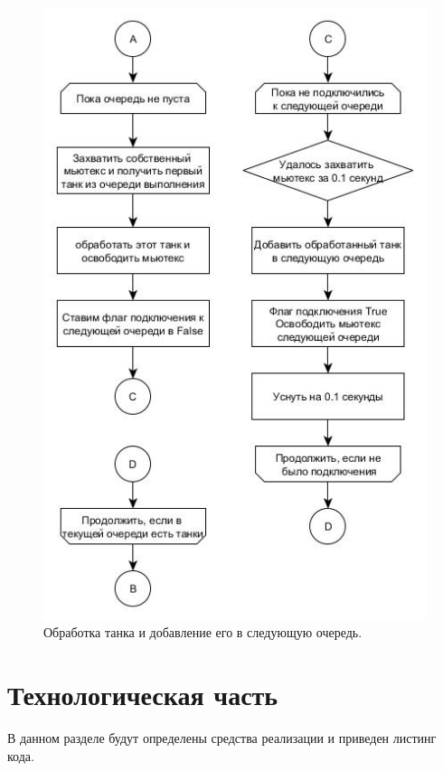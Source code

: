 \documentclass[a4paper, 14pt]{article}
\begin{document}
    \begin{figure}[h!]
    \center
    \includegraphics[scale=0.65]{start_part2.jpg}
    \caption{Обработка танка и добавление его в следующую очередь.}
    \label{ris:start2}
    \end{figure}\newpage
    

	\newpage
	\section{Технологическая часть}
	\hspace{1cm}В данном разделе будут определены средства реализации и приведен листинг кода.
	
\end{document}
